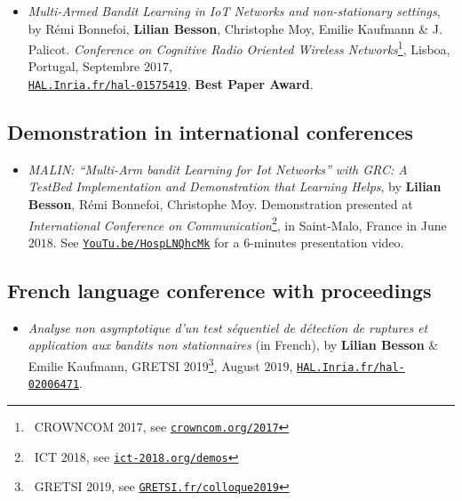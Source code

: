 \begin{itemize}
\item
    \emph{Multi-Armed Bandit Learning in IoT Networks and non-stationary settings},
    by Rémi Bonnefoi, \textbf{Lilian Besson}, Christophe Moy, Emilie Kaufmann \& J. Palicot.
    \emph{Conference on Cognitive Radio Oriented Wireless Networks}\footnote{~CROWNCOM 2017, see \href{http://crowncom.org/2017}{\texttt{crowncom.org/2017}}}, Lisboa, Portugal, Septembre $2017$,\\
    \href{https://HAL.Inria.fr/hal-01575419}{\texttt{HAL.Inria.fr/hal-01575419}},
    \textbf{Best Paper Award}.
    \cite{Bonnefoi17}

\end{itemize}

\subsection{Demonstration in international conferences}

\begin{itemize}

\item
    \emph{MALIN: ``Multi-Arm bandit Learning for Iot Networks'' with GRC: A TestBed Implementation and Demonstration that Learning Helps},
    by \textbf{Lilian Besson}, Rémi Bonnefoi, Christophe Moy.
    Demonstration presented at \emph{International Conference on Communication}\footnote{~ICT 2018, see \href{http://ict-2018.org/demos}{\texttt{ict-2018.org/demos}}}, in Saint-Malo, France in June $2018$.
    See \href{https://YouTu.be/HospLNQhcMk}{\texttt{YouTu.be/HospLNQhcMk}} for a $6$-minutes presentation video.
    \cite{Besson2018ICT}

\end{itemize}


\subsection{French language conference with proceedings}

\begin{itemize}
\item
    \emph{Analyse non asymptotique d'un test séquentiel de détection de ruptures et application aux bandits non stationnaires} (in French),
    by \textbf{Lilian Besson} \& Emilie Kaufmann,
    GRETSI 2019\footnote{~GRETSI 2019, see \href{http://GRETSI.fr/colloque2019}{\texttt{GRETSI.fr/colloque2019}}},
    August $2019$,
    \href{https://HAL.Inria.fr/hal-02006471}{\texttt{HAL.Inria.fr/hal-02006471}}.
    \cite{Besson2019Gretsi}

\end{itemize}



